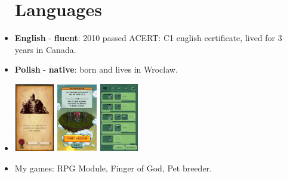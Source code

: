 \documentclass[12pt,a4paper]{article}
\begin{document}
\begin{multicols}{2}
\begin{itemize}[leftmargin=7.0cm]
	\centering	
	\section*{Languages}
	\justifying
	\setlength\itemsep{0.0cm}
	\item[] \textbf{English} - \textbf{fluent}: 2010 passed ACERT: C1 english certificate, lived for 3 years in Canada.
	\item[] \textbf{Polish} - \textbf{native}: born and lives in Wroclaw.
\end{itemize} 

\vfill

\begin{itemize}[leftmargin=7.0cm]
	\centering
	\setlength\itemsep{0.0cm}
	\item[] 	
		\includegraphics[height=3.0cm,width=1.75cm]{games/rpg_module2.png} 
		\includegraphics[height=3.0cm,width=1.75cm]{games/fog.png} 
		\includegraphics[height=3.0cm,width=1.75cm]{games/pet-breeder.jpg}
	\item[]
		My games: RPG Module, Finger of God, Pet breeder.

\end{itemize} 





\end{multicols}
\end{document}
